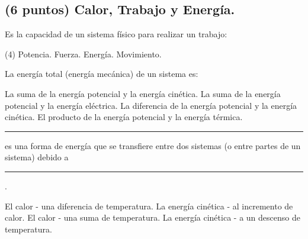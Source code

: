 \documentclass[12pt, letter]{exam}
\begin{document}
\begin{questions}
    \section{(6 puntos) Calor, Trabajo y Energía.}
    
    \question Es la capacidad de un sistema físico para realizar un trabajo:
    \begin{tasks}(4)
        \task Potencia.
        \task Fuerza.
        \task Energía.
        \task Movimiento.
    \end{tasks}
    \question La energía total (energía mecánica) de un sistema es:
    \begin{tasks}
        \task La suma de la energía potencial y la energía cinética.
        \task La suma de la energía potencial y la energía eléctrica.
        \task La diferencia de la energía potencial y la energía cinética.
        \task El producto de la energía potencial y la energía térmica.
    \end{tasks}
    \question \rule{2cm}{0.1mm} es una forma de energía que se transfiere entre dos sistemas (o entre partes de un sistema) debido a \rule{2cm}{0.1mm}.
    \begin{tasks}
        \task El calor - una diferencia de temperatura.
        \task La energía cinética - al incremento de calor.
        \task El calor - una suma de temperatura.
        \task La energía cinética - a un descenso de temperatura.
    \end{tasks}
    

\end{questions}
\end{document}
